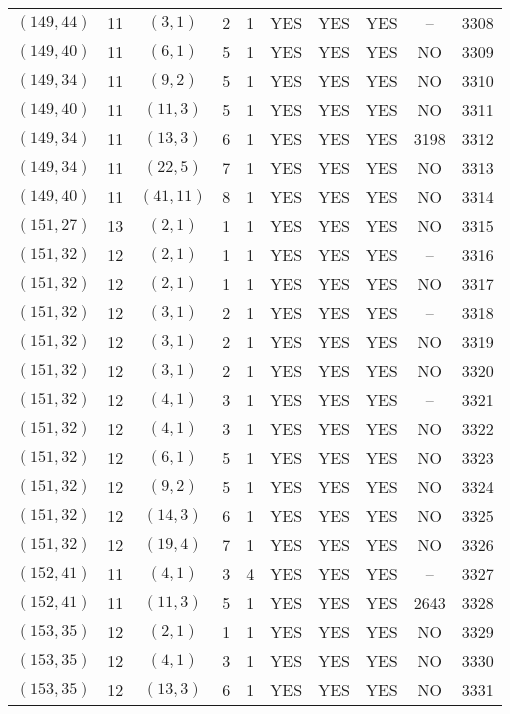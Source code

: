 \begin{longtable}{|c|c|c|c|c|c|c|c|c|c|}
$(149, 44)$ & 11 & $(3, 1)$ & 2 & 1 & YES & YES & YES & -- & 3308\\
$(149, 40)$ & 11 & $(6, 1)$ & 5 & 1 & YES & YES & YES & NO & 3309\\
$(149, 34)$ & 11 & $(9, 2)$ & 5 & 1 & YES & YES & YES & NO & 3310\\
$(149, 40)$ & 11 & $(11, 3)$ & 5 & 1 & YES & YES & YES & NO & 3311\\
$(149, 34)$ & 11 & $(13, 3)$ & 6 & 1 & YES & YES & YES & 3198 & 3312\\
$(149, 34)$ & 11 & $(22, 5)$ & 7 & 1 & YES & YES & YES & NO & 3313\\
$(149, 40)$ & 11 & $(41, 11)$ & 8 & 1 & YES & YES & YES & NO & 3314\\
$(151, 27)$ & 13 & $(2, 1)$ & 1 & 1 & YES & YES & YES & NO & 3315\\
$(151, 32)$ & 12 & $(2, 1)$ & 1 & 1 & YES & YES & YES & -- & 3316\\
$(151, 32)$ & 12 & $(2, 1)$ & 1 & 1 & YES & YES & YES & NO & 3317\\
$(151, 32)$ & 12 & $(3, 1)$ & 2 & 1 & YES & YES & YES & -- & 3318\\
$(151, 32)$ & 12 & $(3, 1)$ & 2 & 1 & YES & YES & YES & NO & 3319\\
$(151, 32)$ & 12 & $(3, 1)$ & 2 & 1 & YES & YES & YES & NO & 3320\\
$(151, 32)$ & 12 & $(4, 1)$ & 3 & 1 & YES & YES & YES & -- & 3321\\
$(151, 32)$ & 12 & $(4, 1)$ & 3 & 1 & YES & YES & YES & NO & 3322\\
$(151, 32)$ & 12 & $(6, 1)$ & 5 & 1 & YES & YES & YES & NO & 3323\\
$(151, 32)$ & 12 & $(9, 2)$ & 5 & 1 & YES & YES & YES & NO & 3324\\
$(151, 32)$ & 12 & $(14, 3)$ & 6 & 1 & YES & YES & YES & NO & 3325\\
$(151, 32)$ & 12 & $(19, 4)$ & 7 & 1 & YES & YES & YES & NO & 3326\\
$(152, 41)$ & 11 & $(4, 1)$ & 3 & 4 & YES & YES & YES & -- & 3327\\
$(152, 41)$ & 11 & $(11, 3)$ & 5 & 1 & YES & YES & YES & 2643 & 3328\\
$(153, 35)$ & 12 & $(2, 1)$ & 1 & 1 & YES & YES & YES & NO & 3329\\
$(153, 35)$ & 12 & $(4, 1)$ & 3 & 1 & YES & YES & YES & NO & 3330\\
$(153, 35)$ & 12 & $(13, 3)$ & 6 & 1 & YES & YES & YES & NO & 3331\\

\end{longtable}
